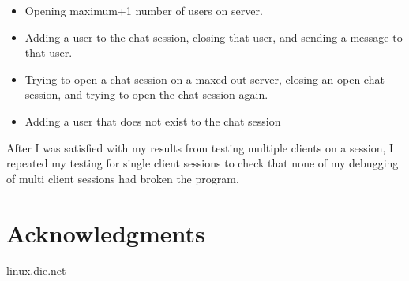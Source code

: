 \documentclass{article}
\begin{document}
\begin{itemize}
  \item Opening maximum+1 number of users on server.
  \item  Adding a user to the chat session, closing that
    user, and sending a message to that user.
  \item Trying to open a chat session on a maxed out
    server, closing an open chat session, and trying
    to open the chat session again.
  \item Adding a user that does not exist to the chat
    session
\end{itemize}

\noindent
After I was satisfied with my results from testing
multiple clients on a session, I repeated my testing
for single client sessions to check that none of my
debugging of multi client sessions had broken the
program. \\

\section{Acknowledgments}
linux.die.net
\end{document}
